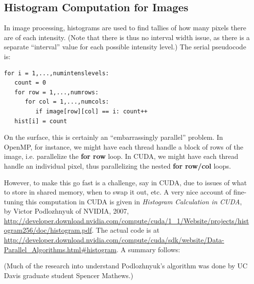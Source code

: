 \subsection{Histogram Computation for Images}

In image processing, histograms are used to find tallies of how many
pixels there are of each intensity.  (Note that there is thus no
interval width issue, as there is a separate ``interval'' value for each
possible intensity level.)  The serial pseudocode is:

\begin{Verbatim}[fontsize=\relsize{-2}]
for i = 1,...,numintenslevels:
   count = 0
   for row = 1,...,numrows:
      for col = 1,...,numcols:
         if image[row][col] == i: count++
   hist[i] = count
\end{Verbatim}

On the surface, this is certainly an ``embarrassingly parallel''
problem.  In OpenMP, for instance, we might have each thread handle a
block of rows of the image, i.e. parallelize the {\bf for row} loop.
In CUDA, we might have each thread handle an individual pixel, thus
parallelizing the nested {\bf for row/col} loops.

However, to make this go fast is a challenge, say in CUDA, due to issues
of what to store in shared memory, when to swap it out, etc.  A very
nice account of fine-tuning this computation in CUDA is given in {\it
Histogram Calculation in CUDA}, by Victor Podlozhnyuk of NVIDIA, 2007,
\url{http://developer.download.nvidia.com/compute/cuda/1_1/Website/projects/histogram256/doc/histogram.pdf}.
The actual code is at
\url{http://developer.download.nvidia.com/compute/cuda/sdk/website/Data-Parallel_Algorithms.html#histogram}.
A summary follows:


(Much of the research into understand Podlozhnyuk's algorithm was done
by UC Davis graduate student Spencer Mathews.)

